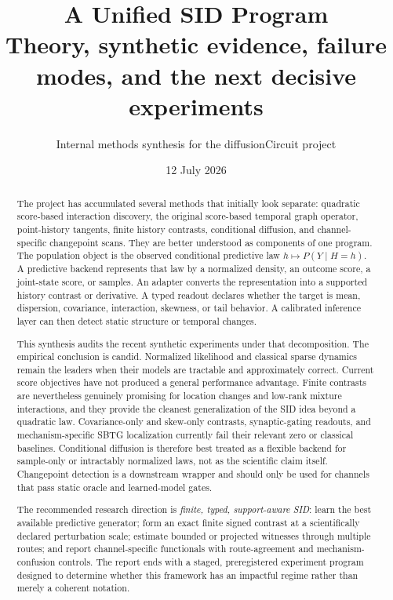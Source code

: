 \documentclass[10pt]{article}
\title{\vspace{-1.2cm}\textbf{A Unified SID Program}\\[3pt]
\large Theory, synthetic evidence, failure modes, and the next decisive experiments}
\author{Internal methods synthesis for the diffusionCircuit project}
\date{12 July 2026}
\begin{document}
\maketitle

\begin{abstract}
The project has accumulated several methods that initially look separate: quadratic score-based interaction discovery, the original score-based temporal graph operator, point-history tangents, finite history contrasts, conditional diffusion, and channel-specific changepoint scans. They are better understood as components of one program. The population object is the observed conditional predictive law \(h\mapsto P(Y\mid H=h)\). A predictive backend represents that law by a normalized density, an outcome score, a joint-state score, or samples. An adapter converts the representation into a supported history contrast or derivative. A typed readout declares whether the target is mean, dispersion, covariance, interaction, skewness, or tail behavior. A calibrated inference layer can then detect static structure or temporal changes.

This synthesis audits the recent synthetic experiments under that decomposition. The empirical conclusion is candid. Normalized likelihood and classical sparse dynamics remain the leaders when their models are tractable and approximately correct. Current score objectives have not produced a general performance advantage. Finite contrasts are nevertheless genuinely promising for location changes and low-rank mixture interactions, and they provide the cleanest generalization of the SID idea beyond a quadratic law. Covariance-only and skew-only contrasts, synaptic-gating readouts, and mechanism-specific SBTG localization currently fail their relevant zero or classical baselines. Conditional diffusion is therefore best treated as a flexible backend for sample-only or intractably normalized laws, not as the scientific claim itself. Changepoint detection is a downstream wrapper and should only be used for channels that pass static oracle and learned-model gates.

The recommended research direction is \emph{finite, typed, support-aware SID}: learn the best available predictive generator; form an exact finite signed contrast at a scientifically declared perturbation scale; estimate bounded or projected witnesses through multiple routes; and report channel-specific functionals with route-agreement and mechanism-confusion controls. The report ends with a staged, preregistered experiment program designed to determine whether this framework has an impactful regime rather than merely a coherent notation.
\end{abstract}
\end{document}
